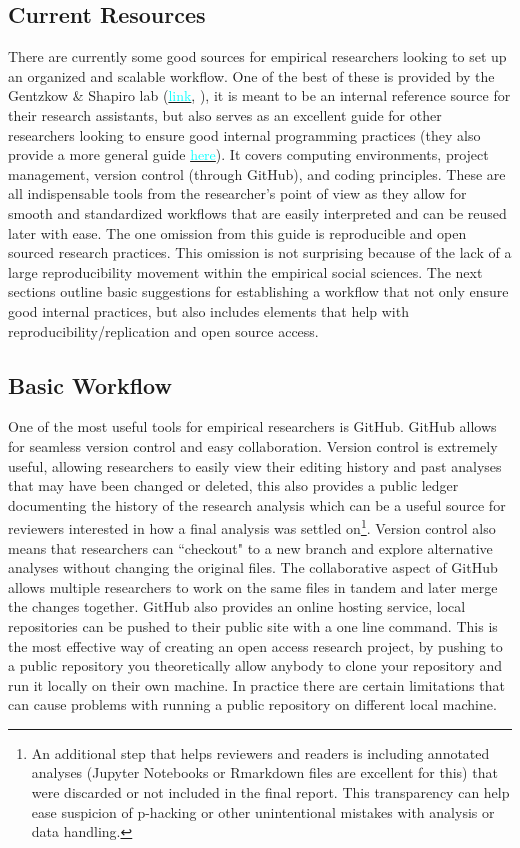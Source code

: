 \documentclass[12pt]{article}
\begin{document}
\subsection{Current Resources}
There are currently some good sources for empirical researchers looking to set up an organized and scalable workflow. One of the best of these is provided by the Gentzkow \& Shapiro lab (\href{https://github.com/gslab-econ/ra-manual/wiki/Getting-Started}{\textcolor{cyan}{link}}, \cite{GSlab}), it is meant to be an internal reference source for their research assistants, but also serves as an excellent guide for other researchers looking to ensure good internal programming practices (they also provide a more general guide \href{https://web.stanford.edu/~gentzkow/research/CodeAndData.xhtml#magicparlabel-20}{\textcolor{cyan}{here}}). It covers computing environments, project management, version control (through GitHub), and coding principles. These are all indispensable tools from the researcher's point of view as they allow for smooth and standardized workflows that are easily interpreted and can be reused later with ease. The one omission from this guide is reproducible and open sourced research practices. This omission is not surprising because of the lack of a large reproducibility movement within the empirical social sciences. The next sections outline basic suggestions for establishing a workflow that not only ensure good internal practices, but also includes elements that help with reproducibility/replication and open source access.

\subsection{Basic Workflow}
One of the most useful tools for empirical researchers is GitHub. GitHub allows for seamless version control and easy collaboration. Version control is extremely useful, allowing researchers to easily view their editing history and past analyses that may have been changed or deleted, this also provides a public ledger documenting the history of the research analysis which can be a useful source for reviewers interested in how a final analysis was settled on\footnote{An additional step that helps reviewers and readers is including annotated analyses (Jupyter Notebooks or Rmarkdown files are excellent for this) that were discarded or not included in the final report. This transparency can help ease suspicion of p-hacking or other unintentional mistakes with analysis or data handling.}. Version control also means that researchers can ``checkout" to a new branch and explore alternative analyses without changing the original files. The collaborative aspect of GitHub allows multiple researchers to work on the same files in tandem and later merge the changes together. GitHub also provides an online hosting service, local repositories can be pushed to their public site with a one line command. This is the most effective way of creating an open access research project, by pushing to a public repository you theoretically allow anybody to clone your repository and run it locally on their own machine. In practice there are certain limitations that can cause problems with running a public repository on different local machine.
\end{document}
